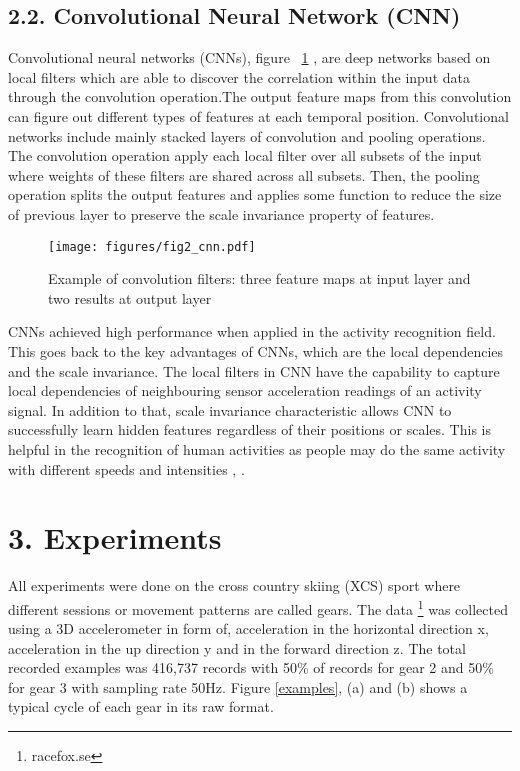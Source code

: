 \documentclass[12pt,a4paper]{article}
\begin{document}
\subsection*{2.2. Convolutional Neural Network (CNN) }

Convolutional neural networks (CNNs), figure ~\ref{CNN} , are deep networks based on local filters which are able to discover the correlation within the input data through the convolution operation.The output feature maps from this convolution can figure out different types of features at each temporal position. Convolutional networks include mainly stacked layers of convolution and pooling operations. The convolution operation apply each local filter over all subsets of the input where weights of these filters are shared across all subsets. Then, the pooling operation splits the output features and applies some function to reduce the size of previous layer to preserve the scale invariance property of features\cite{zeng2014convolutional}.

\begin{figure}[h!]
\centering
\texttt{[image: figures/fig2\_cnn.pdf]}
\caption{Example of convolution filters: three feature maps at input layer and two results at output layer \cite{zeng2014convolutional}}
\label{CNN}
\end{figure}

CNNs achieved high performance when applied in the activity recognition field. This goes back to the key advantages of CNNs, which are the local dependencies and the scale invariance. The local filters in CNN have the capability to capture local dependencies of neighbouring sensor acceleration readings of an activity signal. In addition to that, scale invariance characteristic allows CNN to successfully learn hidden features regardless of their positions or scales. This is helpful in the recognition of human activities as people may do the same activity with different speeds and intensities \cite{zeng2014convolutional}, \cite{yang2015deep}.


\section*{3. Experiments}

All experiments were done on the cross country skiing (XCS) sport where different sessions or movement patterns are called gears. The data \footnote{racefox.se} was collected using a 3D accelerometer in form of, acceleration in the horizontal direction x, acceleration in the up direction y and in the forward direction z. The total recorded examples was 416,737 records with 50\% of records for gear 2 and 50\% for gear 3 with sampling rate 50Hz. Figure \ref{examples}, (a) and (b) shows a typical cycle of each gear in its raw format.
\end{document}
